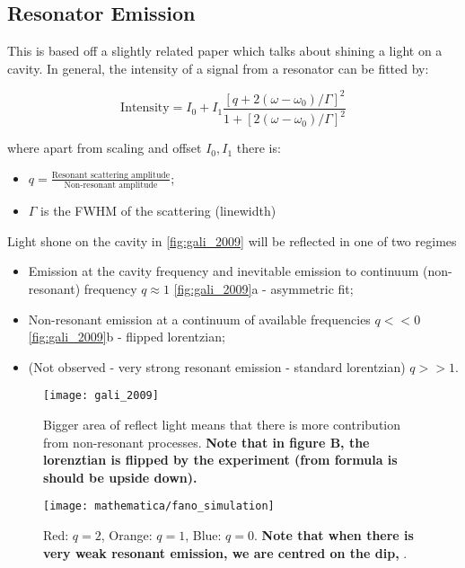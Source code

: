    \subsection{Resonator Emission}
   \label{sec:resonator-emission}

   This is based off a slightly related paper \cite{Galli_2009} which
   talks about shining a light on a cavity. In general, the intensity
   of a signal from a resonator can be fitted by:

   \begin{framed}\noindent
     \begin{equation}
       \text{Intensity} = I_0 + I_1 \frac{\left[ q + 2(\omega - \omega_{0})/\Gamma \right]^2}{1 + \left[ 2(\omega - \omega_0)/\Gamma \right]^2}
     \end{equation}

     \noindent where apart  from scaling and offset  $I_0, I_1$ there
     is:
     \begin{itemize}
     \item
       $q          =         \frac{\text{Resonant          scattering
           amplitude}}{\text{Non-resonant amplitude}}$;
     \item $\Gamma$ is the FWHM of the scattering (linewidth)
     \end{itemize}
   \end{framed}

   \noindent  Light shone  on the  cavity in  \autoref{fig:gali_2009}
   will be reflected in one of two regimes
   \begin{itemize}
   \item Emission at the cavity  frequency and inevitable emission to
     continuum    (non-resonant)    frequency   \hfill    $q\approx1$
     \autoref{fig:gali_2009}a - asymmetric fit;
   \item   Non-resonant  emission   at  a   continuum  of   available
     frequencies \hfill  $q << 0$ \autoref{fig:gali_2009}b  - flipped
     lorentzian;
   \item (Not  observed -  very strong  resonant emission  - standard
     lorentzian) \hfill $q >> 1$.
   \end{itemize}

     \begin{figure}[h]
       \centering \texttt{[image: gali\_2009]}
       \caption{\small Bigger area of  reflect light means that there
         is       more      contribution       from      non-resonant
         processes. \textbf{Note that in  figure B, the lorenztian is
           flipped  by  the experiment  (from  formula  is should  be
           upside down).}\label{fig:gali_2009}}
     \end{figure}

\begin{figure}[h]
  \centering
  \texttt{[image: mathematica/fano\_simulation]}
  \caption{\small   Red:   $q=2$,   Orange:   $q=1$,   Blue:   $q=0$.
    \textbf{Note that when  there is very weak  resonant emission, we
      are centred on the dip, }.\label{fig:fano_simulation}}
\end{figure}

\newpage
